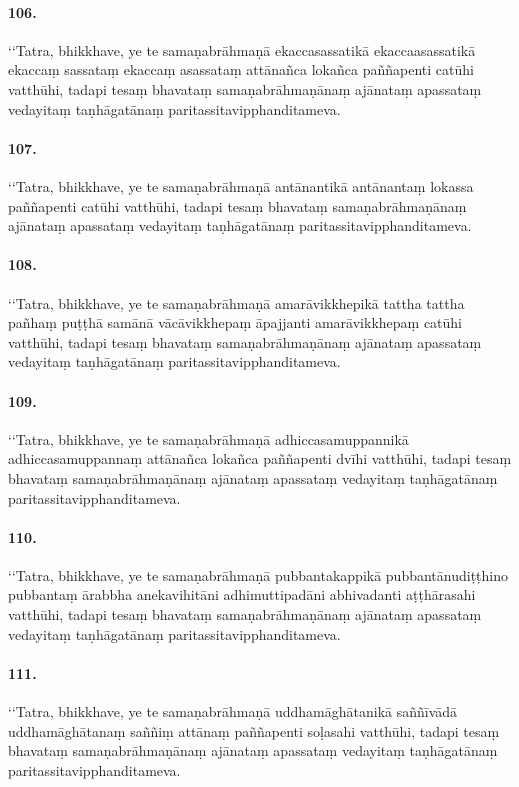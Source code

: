 \paragraph{106.}
‘‘Tatra, bhikkhave, ye te samaṇabrāhmaṇā ekaccasassatikā ekaccaasassatikā ekaccaṃ sassataṃ ekaccaṃ asassataṃ attānañca lokañca paññapenti catūhi vatthūhi, tadapi tesaṃ bhavataṃ samaṇabrāhmaṇānaṃ ajānataṃ apassataṃ vedayitaṃ taṇhāgatānaṃ paritassitavipphanditameva.

\paragraph{107.}
‘‘Tatra, bhikkhave, ye te samaṇabrāhmaṇā antānantikā antānantaṃ lokassa paññapenti catūhi vatthūhi, tadapi tesaṃ bhavataṃ samaṇabrāhmaṇānaṃ ajānataṃ apassataṃ vedayitaṃ taṇhāgatānaṃ paritassitavipphanditameva.

\paragraph{108.}
‘‘Tatra, bhikkhave, ye te samaṇabrāhmaṇā amarāvikkhepikā tattha tattha pañhaṃ puṭṭhā samānā vācāvikkhepaṃ āpajjanti amarāvikkhepaṃ catūhi vatthūhi, tadapi tesaṃ bhavataṃ samaṇabrāhmaṇānaṃ ajānataṃ apassataṃ vedayitaṃ taṇhāgatānaṃ paritassitavipphanditameva.

\paragraph{109.}
‘‘Tatra, bhikkhave, ye te samaṇabrāhmaṇā adhiccasamuppannikā adhiccasamuppannaṃ attānañca lokañca paññapenti dvīhi vatthūhi, tadapi tesaṃ bhavataṃ samaṇabrāhmaṇānaṃ ajānataṃ apassataṃ vedayitaṃ taṇhāgatānaṃ paritassitavipphanditameva.

\paragraph{110.}
‘‘Tatra, bhikkhave, ye te samaṇabrāhmaṇā pubbantakappikā pubbantānudiṭṭhino pubbantaṃ ārabbha anekavihitāni adhimuttipadāni abhivadanti aṭṭhārasahi vatthūhi, tadapi tesaṃ bhavataṃ samaṇabrāhmaṇānaṃ ajānataṃ apassataṃ vedayitaṃ taṇhāgatānaṃ paritassitavipphanditameva.

\paragraph{111.}
‘‘Tatra, bhikkhave, ye te samaṇabrāhmaṇā uddhamāghātanikā saññīvādā uddhamāghātanaṃ saññiṃ attānaṃ paññapenti soḷasahi vatthūhi, tadapi tesaṃ bhavataṃ samaṇabrāhmaṇānaṃ ajānataṃ apassataṃ vedayitaṃ taṇhāgatānaṃ paritassitavipphanditameva.

